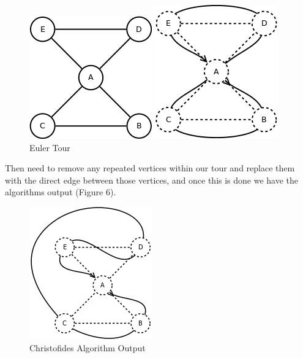 \documentclass[11pt,a4paper,titlepage]{article}
\begin{document}
\begin{figure}[ht]
	\centering
		\begin{minipage}{0.45\textwidth}
			\centering
			\includegraphics[scale=0.5]{WikiComb}
			\caption{$M \bigcup T$}
		\end{minipage}\hfill
		\begin{minipage}{0.45\textwidth}
			\centering
			\includegraphics[scale=0.5]{WikiEulerTour}
			\caption{Euler Tour}
		\end{minipage}\hfill
\end{figure}

Then need to remove any repeated vertices within our tour and replace them with the direct edge between those vertices, and once this is done we have the algorithms output (Figure 6).

\begin{figure}[ht]
\includegraphics[scale=0.6]{WikiRemove}
\centering
\caption{Christofides Algorithm Output}
\end{figure}
\end{document}
